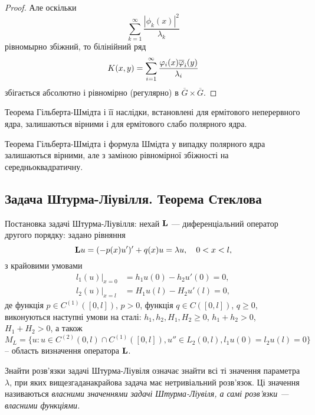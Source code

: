 \begin{proof}
    Але оскільки
    \begin{equation}
        \sum_{k=1}^\infty\frac{|\phi_k(x)|^2}{\lambda_k}
    \end{equation}
    рівномырно збіжний, то білінійний ряд
    \begin{equation}
        K(x,y)=\Sum_{i=1}^\infty\dfrac{\phi_i(x)\overline\phi_i(y)}{\lambda_i}
    \end{equation}
    збігається абсолютно і рівномірно (регулярно) в $\overline G\times\overline G$.
\end{proof}

\begin{remark}
    Теорема Гільберта-Шмідта і її наслідки, встановлені для ермітового неперервного ядра, залишаються вірними і для ермітового слабо полярного ядра.
\end{remark}

\begin{remark}
    Теорема Гільберта-Шмідта і формула Шмідта у випадку полярного ядра залишаються вірними, але з заміною рівномірної збіжності на середньоквадратичну.
\end{remark}

\subsection{Задача Штурма-Ліувілля. Теорема Стеклова}

Постановка задачі Штурма-Ліувілля: нехай $\bf{L}$ --- диференціальний оператор другого порядку: задано рівняння
\begin{equation}
    \bf{L}u=(-p(x)u')'+q(x)u=\lambda u,\quad0<x<l,
\end{equation}
з крайовими умовами
\begin{align}
    l_1(u)|_{x=0}&=h_1u(0)-h_2u'(0)=0,\\
    l_2(u)|_{x=l}&=H_1u(l)-H_2u'(l)=0,
\end{align}
де функція $p\in C^{(1)}([0,l])$, $p>0$, функція $q\in C([0,l])$, $q\ge0$, виконуються наступні умови на сталі: $h_1, h_2, H_1, H_2 \ge 0$, $h_1+h_2>0$, $H_1+H_2>0$,
а також
\begin{equation}
    M_L=\{u:u\in C^{(2)}(0,l)\cap C^{(1)}([0,l]), u''\in L_2(0,l), l_1u(0)=l_2u(l)=0\}
\end{equation}
-- область визначення оператора $\bf{L}$.

\begin{definition}
    Знайти розв'язки задачі Штурма-Ліувіля означає знайти всі ті значення параметра $\lambda$, при яких вищезгаданакрайова задача має нетривіальний розв'язок. Ці значення називаються \it{власними значеннями} задачі Штурма-Ліувіля, а самі розв'язки --- \it{власними функціями}.
\end{definition}

